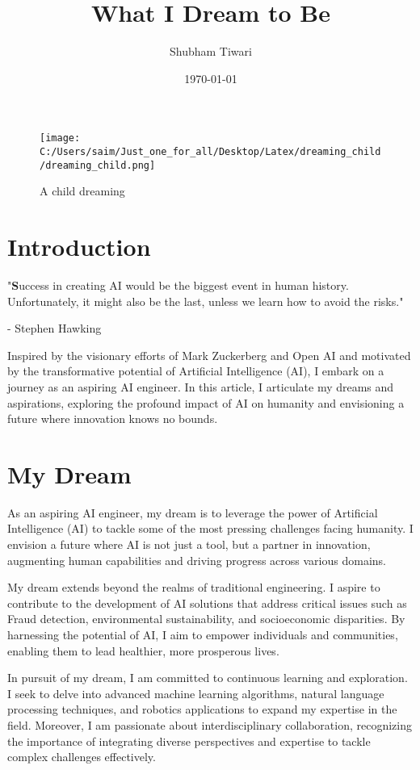 \documentclass[12pt,a4paper]{article}
\title{\Large\textbf{What I Dream to Be}}
\author{Shubham Tiwari}
\date{\today}
\begin{document}
\begin{wrapfigure}{r}{0.2\textwidth}
    \vspace{-2.5\baselineskip}
    \texttt{[image: C:/Users/saim/Just\_one\_for\_all/Desktop/Latex/dreaming\_child/dreaming\_child.png]} 
    \caption{A child dreaming}
    \label{fig:dreaming_child}
\end{wrapfigure}


\maketitle


\section{Introduction}
"\textbf{S}uccess in creating AI would be the biggest event in human history. Unfortunately, it might also be the last, unless we learn how to avoid the risks."
\begin{flushright}
- Stephen Hawking
\end{flushright}

Inspired by the visionary efforts of Mark Zuckerberg and Open AI and motivated by the transformative potential of Artificial Intelligence (AI), I embark on a journey as an aspiring AI engineer. In this article, I articulate my dreams and aspirations, exploring the profound impact of AI on humanity and envisioning a future where innovation knows no bounds.

\section{My Dream}

As an aspiring AI engineer, my dream is to leverage the power of Artificial Intelligence (AI) to tackle some of the most pressing challenges facing humanity. I envision a future where AI is not just a tool, but a partner in innovation, augmenting human capabilities and driving progress across various domains.

My dream extends beyond the realms of traditional engineering. I aspire to contribute to the development of AI solutions that address critical issues such as Fraud detection, environmental sustainability, and socioeconomic disparities. By harnessing the potential of AI, I aim to empower individuals and communities, enabling them to lead healthier, more prosperous lives.

In pursuit of my dream, I am committed to continuous learning and exploration. I seek to delve into advanced machine learning algorithms, natural language processing techniques, and robotics applications to expand my expertise in the field. Moreover, I am passionate about interdisciplinary collaboration, recognizing the importance of integrating diverse perspectives and expertise to tackle complex challenges effectively.
\end{document}
